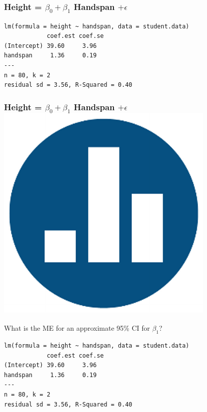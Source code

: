 \documentclass[handout]{beamer}
\begin{document}



\begin{frame}[fragile]
\frametitle{Height = $\beta_0 + \beta_1$ Handspan $+ \epsilon$}
\footnotesize
\begin{verbatim}
lm(formula = height ~ handspan, data = student.data)
            coef.est coef.se
(Intercept) 39.60     3.96  
handspan     1.36     0.19  
---
n = 80, k = 2
residual sd = 3.56, R-Squared = 0.40
\end{verbatim}

\end{frame}
\begin{frame}[fragile]
\frametitle{Height = $\beta_0 + \beta_1$ Handspan $+ \epsilon$ \hfill \includegraphics[scale = 0.05]{./images/clicker}}
\alert{What is the ME for an approximate 95\% CI for $\beta_1$?}
\footnotesize
\begin{verbatim}
lm(formula = height ~ handspan, data = student.data)
            coef.est coef.se
(Intercept) 39.60     3.96  
handspan     1.36     0.19  
---
n = 80, k = 2
residual sd = 3.56, R-Squared = 0.40
\end{verbatim}
\end{frame}
\end{document}
